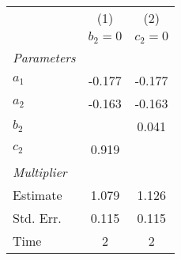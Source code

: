 \begin{tabular}{lcc}
    \toprule
    & (1) & (2) \\
    & $b_2 = 0$ & $c_2 = 0$ \\
    \midrule
    \emph{Parameters} \\
    \quad $a_1$ & -0.177 & -0.177 \\
    \quad $a_2$ & -0.163 & -0.163 \\
    \quad $b_2$ && 0.041 \\
    \quad $c_2$ & 0.919 \\
    \midrule
    \emph{Multiplier} \\
    \quad Estimate & 1.079 & 1.126 \\
    \quad Std. Err. & 0.115 & 0.115 \\
    \quad Time & 2 & 2 \\
    \bottomrule
\end{tabular}